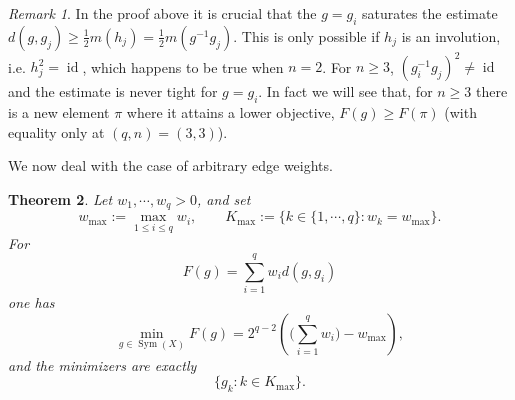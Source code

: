 \documentclass[11pt,oneside,letterpaper]{article}
\numberwithin{equation}{section}
\newtheorem{theorem}{Theorem}
\theoremstyle{definition}
\theoremstyle{remark}
\newtheorem{remark}[theorem]{Remark}
\DeclareMathOperator{\id}{id}
\DeclareMathOperator{\Sym}{Sym}
\begin{document}
\begin{remark}
  In the proof above it is crucial that the $g=g_i$ saturates the estimate $d(g,g_j)\ge\frac{1}{2}m(h_j)=\frac{1}{2}m(g^{-1}g_j)$.
  This is only possible if $h_j$ is an involution, i.e. $h_j^2=\id$, which happens to be true when $n=2$. For $n\ge3$, $(g_i^{-1}g_j)^2\ne \id$ and the estimate is never tight for $g=g_i$. In fact we will see that, for $n\ge 3$ there is a new element $\pi$ where it attains a lower objective, $F(g)\ge F(\pi)$ (with equality only at $(q, n)=(3,3)$).
\end{remark}

We now deal with the case of arbitrary edge weights.
\begin{theorem}
  \label{thm:1TN_w}
  Let $w_1,\cdots,w_q>0$, and set
  \begin{equation}
    w_{\max}:=\max_{1\le i\le q}w_i,\qquad
    K_{\max}:=\{k\in\{1,\cdots,q\}:w_k=w_{\max}\}.
  \end{equation}
  For
  \begin{equation}
    F(g) = \sum_{i=1}^q w_i d(g,g_i)
  \end{equation}
  one has
  \begin{equation}
    \min_{g\in \Sym(X)}F(g)
    =
    2^{q-2}\left(\Big(\sum_{i=1}^q w_i \Big)-w_{\max}\right),
  \end{equation}
  and the minimizers are exactly
  \begin{equation}
    \{g_k:k\in K_{\max}\}.
  \end{equation}
\end{theorem}
\end{document}
